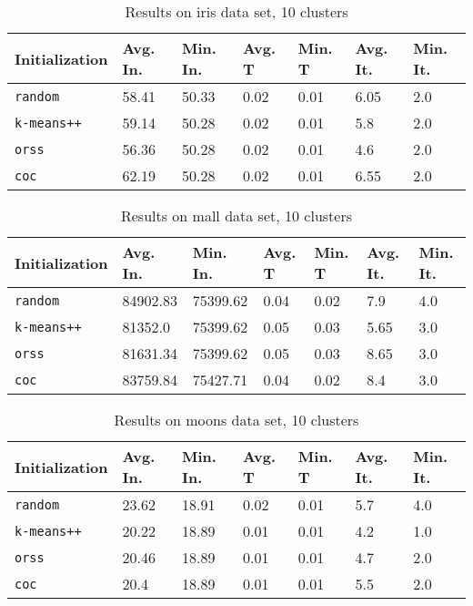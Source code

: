 \begin{table}[p]
	\begin{center}
		\begin{tabular}{|l|l|l|l|l|l|l|}
			\hline
			Initialization & Avg. In. & Min. In. & Avg. T & Min. T & Avg. It. & Min. It.\\\hline
			\texttt{random} & 58.41 & 50.33 & 0.02 & 0.01 & 6.05 & 2.0\\\hline
			\texttt{k-means++} & 59.14 & 50.28 & 0.02 & 0.01 & 5.8 & 2.0\\\hline
			\texttt{orss} & 56.36 & 50.28 & 0.02 & 0.01 & 4.6 & 2.0\\\hline
			\texttt{coc} & 62.19 & 50.28 & 0.02 & 0.01 & 6.55 & 2.0\\\hline
		\end{tabular}
		\caption{Results on iris data set, 10 clusters}
		\label{tbl:iris10}
	\end{center}
\end{table}

\begin{table}[p]
	\begin{center}
		\begin{tabular}{|l|l|l|l|l|l|l|}
			\hline
			Initialization & Avg. In. & Min. In. & Avg. T & Min. T & Avg. It. & Min. It.\\\hline
			\texttt{random} & 84902.83 & 75399.62 & 0.04 & 0.02 & 7.9 & 4.0\\\hline
			\texttt{k-means++} & 81352.0 & 75399.62 & 0.05 & 0.03 & 5.65 & 3.0\\\hline
			\texttt{orss} & 81631.34 & 75399.62 & 0.05 & 0.03 & 8.65 & 3.0\\\hline
			\texttt{coc} & 83759.84 & 75427.71 & 0.04 & 0.02 & 8.4 & 3.0\\\hline
		\end{tabular}
		\caption{Results on mall data set, 10 clusters}
		\label{tbl:mall10}
	\end{center}
\end{table}

\begin{table}[p]
	\begin{center}
		\begin{tabular}{|l|l|l|l|l|l|l|}
			\hline
			Initialization & Avg. In. & Min. In. & Avg. T & Min. T & Avg. It. & Min. It.\\\hline
			\texttt{random} & 23.62 & 18.91 & 0.02 & 0.01 & 5.7 & 4.0\\\hline
			\texttt{k-means++} & 20.22 & 18.89 & 0.01 & 0.01 & 4.2 & 1.0\\\hline
			\texttt{orss} & 20.46 & 18.89 & 0.01 & 0.01 & 4.7 & 2.0\\\hline
			\texttt{coc} & 20.4 & 18.89 & 0.01 & 0.01 & 5.5 & 2.0\\\hline
		\end{tabular}
		\caption{Results on moons data set, 10 clusters}
		\label{tbl:moons10}
	\end{center}
\end{table}

